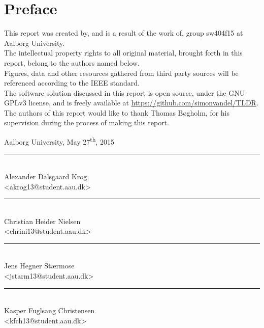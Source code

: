 \chapter{Preface}\label{ch:preface}
This report was created by, and is a result of the work of, group sw404f15 at Aalborg University. \\
The intellectual property rights to all original material, brought forth in this report, belong to the authors named below.\\
Figures, data and other resources gathered from third party sources will be referenced according to the IEEE standard. \\
The software solution discussed in this report is open source, under the GNU GPLv3 license, and is freely available at \url{https://github.com/simonvandel/TLDR}.\\

The authors of this report would like to thank Thomas Bøgholm, for his supervision during the process of making this report.

\vspace{\baselineskip}\hfill Aalborg University, May 27\textsuperscript{th}, 2015
\vfill

\noindent
\begin{minipage}[b]{0.45\textwidth}
 \centering
 \rule{\textwidth}{0.5pt}\\
  Alexander Dalsgaard Krog\\
 {\footnotesize <akrog13@student.aau.dk>}
\end{minipage}
%
\hfill
%
\begin{minipage}[b]{0.45\textwidth}
 \centering
 \rule{\textwidth}{0.5pt}\\
  Christian Heider Nielsen\\
 {\footnotesize <chrini13@student.aau.dk>}
\end{minipage}
%
\vspace{3\baselineskip}

\noindent
\begin{minipage}[b]{0.45\textwidth}
 \centering
 \rule{\textwidth}{0.5pt}\\
 Jens Hegner Stærmose\\
 {\footnotesize <jstarm13@student.aau.dk>}
\end{minipage}
%
\hfill
%
\begin{minipage}[b]{0.45\textwidth}
 \centering
 \rule{\textwidth}{0.5pt}\\
  Kasper Fuglsang Christensen\\
 {\footnotesize <kfch13@student.aau.dk>}
\end{minipage}
\vspace{3\baselineskip}

